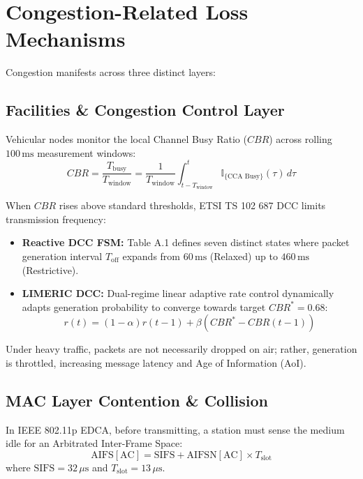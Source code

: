 \documentclass[11pt,a4paper]{article}
\begin{document}
\section{Congestion-Related Loss Mechanisms}

Congestion manifests across three distinct layers:

\subsection{Facilities \& Congestion Control Layer}
Vehicular nodes monitor the local Channel Busy Ratio ($CBR$) across rolling $100\,\mathrm{ms}$ measurement windows:
\begin{equation}
CBR = \frac{T_{\mathrm{busy}}}{T_{\mathrm{window}}} = \frac{1}{T_{\mathrm{window}}} \int_{t-T_{\mathrm{window}}}^t \mathbb{I}_{\{\text{CCA Busy}\}}(\tau) \, d\tau
\end{equation}

When $CBR$ rises above standard thresholds, ETSI TS 102 687 DCC limits transmission frequency:
\begin{itemize}[noitemsep]
    \item \textbf{Reactive DCC FSM:} Table A.1 defines seven distinct states where packet generation interval $T_{\mathrm{off}}$ expands from $60\,\mathrm{ms}$ (Relaxed) up to $460\,\mathrm{ms}$ (Restrictive).
    \item \textbf{LIMERIC DCC:} Dual-regime linear adaptive rate control dynamically adapts generation probability to converge towards target $CBR^* = 0.68$:
    \begin{equation}
    r(t) = (1 - \alpha) r(t-1) + \beta \left( CBR^* - CBR(t-1) \right)
    \end{equation}
\end{itemize}
Under heavy traffic, packets are not necessarily dropped on air; rather, generation is throttled, increasing message latency and Age of Information (AoI).

\subsection{MAC Layer Contention \& Collision}
In IEEE 802.11p EDCA, before transmitting, a station must sense the medium idle for an Arbitrated Inter-Frame Space:
\begin{equation}
\mathrm{AIFS}[\mathrm{AC}] = \mathrm{SIFS} + \mathrm{AIFSN}[\mathrm{AC}] \times T_{\mathrm{slot}}
\end{equation}
where $\mathrm{SIFS} = 32\,\mu\mathrm{s}$ and $T_{\mathrm{slot}} = 13\,\mu\mathrm{s}$.
\end{document}
